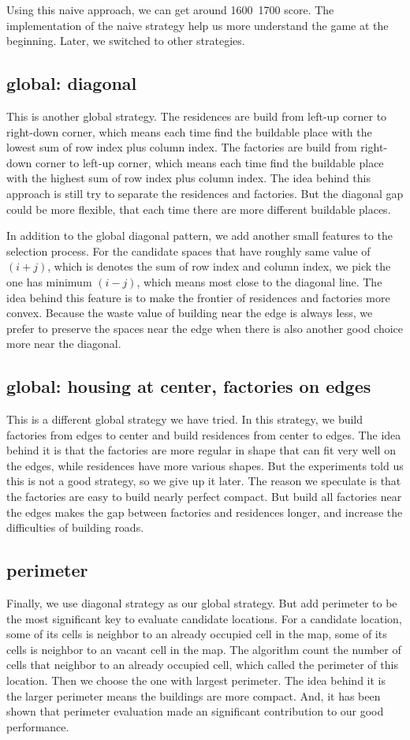 \documentclass{article}
\begin{document}
Using this naive approach, we can get around 1600~1700 score. The implementation of the naive strategy help us more understand the game at the beginning. Later, we switched to other strategies.
\subsection{global: diagonal}
This is another global strategy. The residences are build from left-up corner to right-down corner, which means each time find the buildable place with the lowest sum of row index plus column index. The factories are build from right-down corner to left-up corner, which means each time find the buildable place with the highest sum of row index plus column index. The idea behind this approach is still try to separate the residences and factories. But the diagonal gap could be more flexible, that each time there are more different buildable places.

In addition to the global diagonal pattern, we add another small features to the selection process. For the candidate spaces that have roughly same value of $(i+j)$, which is denotes the sum of row index and column index, we pick the one has minimum $(i-j)$, which means most close to the diagonal line. The idea behind this feature is to make the frontier of residences and factories more convex. Because the waste value of building near the edge is always less, we prefer to preserve the spaces near the edge when there is also another good choice more near the diagonal.
\subsection{global: housing at center, factories on edges}
This is a different global strategy we have tried. In this strategy, we build factories from edges to center and build residences from center to edges. The idea behind it is that the factories are more regular in shape that can fit very well on the edges, while residences have more various shapes. But the experiments told us this is not a good strategy, so we give up it later. The reason we speculate is that the factories are easy to build nearly perfect compact. But build all factories near the edges makes the gap between factories and residences longer, and increase the difficulties of building roads.
\subsection{perimeter}
Finally, we use diagonal strategy as our global strategy. But add perimeter to be the most significant key to evaluate candidate locations. For a candidate location, some of its cells is neighbor to an already occupied cell in the map, some of its cells is neighbor to an vacant cell in the map. The algorithm count the number of cells that neighbor to an already occupied cell, which called the perimeter of this location. Then we choose the one with largest perimeter. The idea behind it is the larger perimeter means the buildings are more compact. And, it has been shown that perimeter evaluation made an significant contribution to our good performance.
\end{document}
